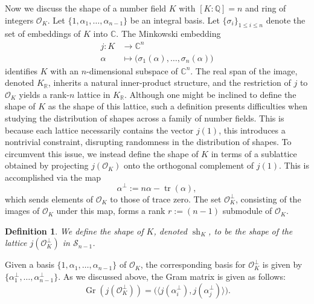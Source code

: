 \documentclass[table]{amsart}
\newtheorem{definition}[theorem]{Definition}
\newcommand{\Q}{\mathbb{Q}}
\newcommand{\cO}{\mathcal{O}}
\newcommand{\cS}{\mathcal{S}}
\newcommand{\op}[1]{\operatorname{#1}}
\numberwithin{equation}{section}
\begin{document}



\medskip
\par Now we discuss the shape of a number field $K$ with $[K:\Q]=n$ and ring of integers $\cO_K$. Let $ \{1, \alpha_1, \dots, \alpha_{n-1}\} $ be an integral basis. Let $ \{\sigma_i\}_{1 \leq i \leq n} $ denote the set of embeddings of $ K $ into $ \mathbb{C} $. The Minkowski embedding  
\[
\begin{aligned}
    j: K &\to \mathbb{C}^{n} \\
    \alpha &\mapsto \big( \sigma_1(\alpha), \dots, \sigma_n(\alpha) \big)
\end{aligned}
\]
identifies $ K $ with an $ n $-dimensional subspace of $ \mathbb{C}^n $. The real span of the image, denoted $ K_{\mathbb{R}} $, inherits a natural inner-product structure, and the restriction of $ j $ to $ \mathcal{O}_{K} $ yields a rank-$ n $ lattice in $ K_{\mathbb{R}} $. Although one might be inclined to define the shape of $ K $ as the shape of this lattice, such a definition presents difficulties when studying the distribution of shapes across a family of number fields. This is because each lattice necessarily contains the vector $ j(1) $, this introduces a nontrivial constraint, disrupting randomness in the distribution of shapes. To circumvent this issue, we instead define the shape of $ K $ in terms of a sublattice obtained by projecting $ j(\mathcal{O}_K) $ onto the orthogonal complement of $ j(1) $. This is accomplished via the map  
\[
\alpha^{\perp} := n\alpha - \operatorname{tr}(\alpha),
\]
which sends elements of $ \mathcal{O}_K $ to those of trace zero. The set $ \mathcal{O}_K^{\perp} $, consisting of the images of $ \mathcal{O}_K $ under this map, forms a rank $r:=(n-1)$ submodule of $ \mathcal{O}_K $. 
\begin{definition}
    We define the shape of $K$, denoted $\op{sh}_K$, to be the shape of the lattice $j(\cO_K^\perp)$ in $\cS_{n-1}$.
\end{definition}
Given a basis $ \{1, \alpha_1, \dots, \alpha_{n-1}\} $ of $ \mathcal{O}_K $, the corresponding basis for $ \mathcal{O}_K^{\perp} $ is given by $\{\alpha_1^{\perp}, \dots, \alpha_{n-1}^{\perp} \} $. As we discussed above, the Gram matrix is given as follows: 
\begin{equation}\label{gram matrix computation}
\operatorname{Gr}\left(j\left(\mathcal{O}_{K}^{\perp}\right)\right) = \big( \langle j(\alpha_i^{\perp}), j(\alpha_j^{\perp}) \rangle \big).
\end{equation}
\end{document}
